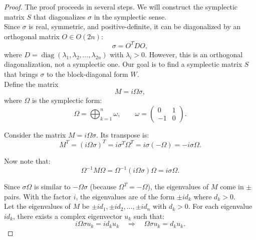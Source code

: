 \begin{proof}
The proof proceeds in several steps. We will construct the symplectic matrix $S$ that diagonalizes $\sigma$ in the symplectic sense.\\

Since $\sigma$ is real, symmetric, and positive-definite, it can be diagonalized by an orthogonal matrix $O \in O(2n)$:
\begin{equation}
    \sigma = O^T D O,
\end{equation}
where $D = \operatorname{diag}(\lambda_1, \lambda_2, \ldots, \lambda_{2n})$ with $\lambda_i > 0$. However, this is an orthogonal diagonalization, not a symplectic one. Our goal is to find a symplectic matrix $S$ that brings $\sigma$ to the block-diagonal form $W$.\\

Define the matrix
\begin{equation}
    M = i \Omega \sigma,
\end{equation}
where $\Omega$ is the symplectic form:
\begin{equation}
    \Omega = \bigoplus_{k=1}^{n} \omega, \qquad \omega = \begin{pmatrix} 0 & 1 \\ -1 & 0 \end{pmatrix}.
\end{equation}

Consider the matrix $M = i\Omega\sigma$. Its transpose is:
\begin{equation}
    M^T = (i\Omega\sigma)^T = i \sigma^T \Omega^T = i \sigma (-\Omega) = -i \sigma \Omega.
\end{equation}

Now note that:
\begin{equation}
    \Omega^{-1} M \Omega = \Omega^{-1} (i \Omega \sigma) \Omega = i \sigma \Omega.
\end{equation}

Since $\sigma \Omega$ is similar to $-\Omega \sigma$ (because $\Omega^T = -\Omega$), the eigenvalues of $M$ come in $\pm$ pairs. With the factor $i$, the eigenvalues are of the form $\pm i d_k$ where $d_k > 0$.\\

Let the eigenvalues of $M$ be $\pm i d_1, \pm i d_2, \ldots, \pm i d_n$ with $d_k > 0$. For each eigenvalue $i d_k$, there exists a complex eigenvector $u_k$ such that:
\begin{equation}
    i \Omega \sigma u_k = i d_k u_k \quad \Rightarrow \quad \Omega \sigma u_k = d_k u_k.
\end{equation}


\end{proof}
